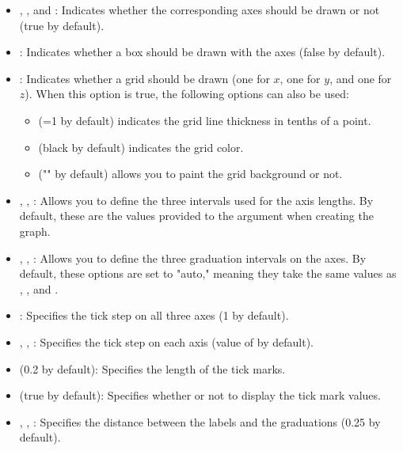 \begin{itemize}
    \item {}, , and : Indicates whether the corresponding axes should be drawn or not (true by default).

    \item {}: Indicates whether a box should be drawn with the axes (false by default).

    \item {}: Indicates whether a grid should be drawn (one for $x$, one for $y$, and one for $z$). When this option is true, the following options can also be used:
\begin{itemize}
    \item {} (=1 by default) indicates the grid line thickness in tenths of a point.
    \item {} (black by default) indicates the grid color.
    \item {} ("" by default) allows you to paint the grid background or not.
\end{itemize}

    \item {}, , : Allows you to define the three intervals used for the axis lengths. By default, these are the values ​​provided to the  argument when creating the graph.

    \item {}, , : Allows you to define the three graduation intervals on the axes. By default, these options are set to "auto," meaning they take the same values ​​as , , and .
    \item {}: Specifies the tick step on all three axes (1 by default).
    \item {}, , : Specifies the tick step on each axis (value of  by default).

    \item {} (0.2 by default): Specifies the length of the tick marks.

    \item {} (true by default): Specifies whether or not to display the tick mark values.

    \item {}, , : Specifies the distance between the labels and the graduations (0.25 by default).


\end{itemize}
